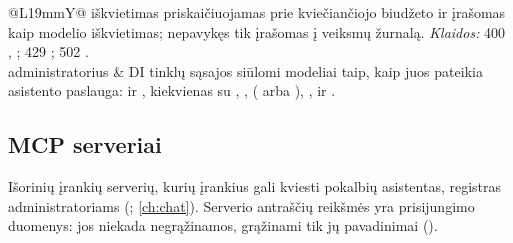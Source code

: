 \begin{xltabular}{\textwidth}{@{}L{19mm}Y@{}}
  iškvietimas priskaičiuojamas prie kviečiančiojo biudžeto ir įrašomas kaip modelio
  iškvietimas; nepavykęs tik įrašomas į veiksmų žurnalą. \emph{Klaidos:} 400
  , ; 429 ; 502
  . \\
\addlinespace
{}
administratorius & DI tinklų sąsajos siūlomi modeliai taip, kaip juos pateikia asistento
  paslauga:  ir , kiekvienas su , ,
   ( arba ), , 
  ir . \\
\end{xltabular}

\subsection{MCP serveriai}\label{sec:api:mcp}

Išorinių įrankių serverių, kurių įrankius gali kviesti pokalbių asistentas, registras
administratoriams (; \cref{ch:chat}). Serverio antraščių
reikšmės yra prisijungimo duomenys: jos niekada negrąžinamos, grąžinami tik jų pavadinimai
().

